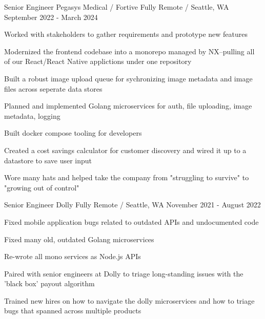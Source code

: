 

\begin{cventries}
  \cventry
    {Senior Engineer} %
    {Pegasys Medical / Fortive} %
    {Fully Remote / Seattle, WA} %
    {September 2022 - March 2024} %
    {
      \begin{cvitems} %
        \item {Worked with stakeholders to gather requirements and prototype new features}
        \item {Modernized the frontend codebase into a monorepo managed by NX--pulling all of our React/React Native applictions under one repository}
        \item {Built a robust image upload queue for sychronizing image metadata and image files across seperate data stores}
        \item {Planned and implemented Golang microservices for auth, file uploading, image metadata, logging}
        \item {Built docker compose tooling for developers}
        \item {Created a cost savings calculator for customer discovery and wired it up to a datastore to save user input}
        \item {Wore many hats and helped take the company from "struggling to survive" to "growing out of control"}
      \end{cvitems}
    }

  \cventry
    {Senior Engineer} %
    {Dolly} %
    {Fully Remote / Seattle, WA} %
    {November 2021 - August 2022} %
    {
      \begin{cvitems} %
        \item {Fixed mobile application bugs related to outdated APIs and undocumented code}
        \item {Fixed many old, outdated Golang microservices}
        \item {Re-wrote all mono services as Node.js APIs}
        \item {Paired with senior engineers at Dolly to triage long-standing issues with the 'black box' payout algorithm}
        \item {Trained new hires on how to navigate the dolly microservices and how to triage bugs that spanned across multiple products}
      \end{cvitems}
    }


\end{cventries}
